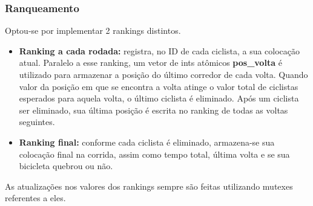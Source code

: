 \documentclass{beamer}
\begin{document}




\begin{frame}
\frametitle{Ranqueamento}
Optou-se por implementar 2 rankings distintos.


\begin{itemize}
\item \textbf{Ranking a cada rodada:} registra, no ID de cada ciclista, a sua colocação atual. Paralelo a esse ranking,
    um vetor de ints atômicos \textbf{pos\_volta} é utilizado para armazenar a posição do último corredor de cada volta.
        Quando  valor da posição em que se encontra a volta atinge o valor total de ciclistas esperados para aquela
        volta, o último ciclista é eliminado.
        Após um ciclista ser eliminado, sua última posição é escrita no ranking de todas as voltas seguintes.

\item \textbf{Ranking final:} conforme cada ciclista é eliminado, armazena-se sua colocação final na corrida, assim como tempo total, última volta e se sua bicicleta quebrou ou não.   
\end{itemize}

As atualizações nos valores dos rankings sempre são feitas utilizando mutexes referentes a eles.
\end{frame}
\end{document}
